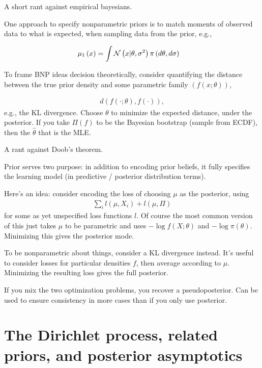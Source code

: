 \documentclass{article}
\begin{document}
A short rant against empirical bayesians.

One approach to specify nonparametric priors is to match moments of observed data to what
is expected, when sampling data from the prior, e.g.,

\begin{align}
  \mu_{1}\left(x\right) &= \int \mathcal{N}\left(x \vert \theta, \sigma^{2}\right) \pi\left(d\theta, d\sigma\right)
\end{align}

To frame BNP ideas decision theoretically, consider quantifying the distance
between the true prior density and some parametric family $\left(f\left(x;
\theta\right)\right)$,

\begin{align}
d\left(f\left(\cdot; \theta\right), f\left(\cdot\right)\right),
\end{align}
e.g., the KL divergence. Choose $\theta$ to minimize the expected distance,
under the posterior. If you take $\Pi\left(f\right)$ to be the Bayesian
bootstrap (sample from ECDF), then the $\hat{\theta}$ that is the MLE.

A rant against Doob's theorem.

Prior serves two purpose: in addition to encoding prior beliefs, it fully
specifies the learning model (in predictive / posterior distribution terms).

Here's an idea: consider encoding the loss of choosing $\mu$ as the posterior,
using
\begin{align}
  \sum_{i} l\left(\mu, X_{i}\right) + l\left(\mu, \Pi\right)
\end{align}
for some as yet unspecified loss functions $l$. Of course the most common
version of this just takes $\mu$ to be parametric and uses $-\log f\left(X;
\theta\right)$ and $-\log\pi\left(\theta\right)$. Minimizing this gives the
posterior mode.

To be nonparametric about things, consider a KL divergence instead. It's useful
to consider losses for particular densities $f$, then average according to
$\mu$. Minimizing the resulting loss gives the full posterior.

If you mix the two optimization problems, you recover a pseudoposterior. Can be
used to ensure consistency in more cases than if you only use posterior.

\pagebreak

\section{The Dirichlet process, related priors, and posterior asymptotics}
\end{document}
